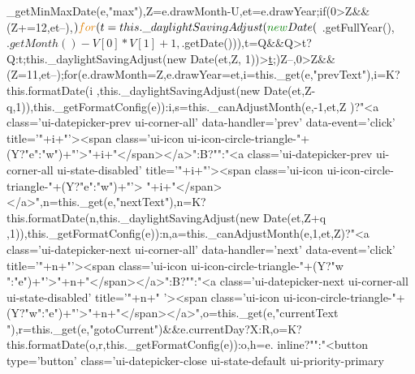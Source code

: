 \begin{DoxyCode}
      \_getMinMaxDate(e,\textcolor{stringliteral}{"max"}),Z=e.drawMonth-U,et=e.drawYear;\textcolor{keywordflow}{if}(0>Z&&(Z+=12,et--),$)\textcolor{keywordflow}{for}(t=this.\_daylightSavingAdjust(\textcolor{keyword}{new} Date($
      .getFullYear(),$.getMonth()-V[0]*V[1]+1,$.getDate())),t=Q&&Q>t?Q:t;this.\_daylightSavingAdjust(\textcolor{keyword}{new} Date(et,Z,
      1))>\hyperlink{jquery-2_80_83_8min_8js_aaccc9105df5383111407fd5b41255e23}{t};)Z--,0>Z&&(Z=11,et--);\textcolor{keywordflow}{for}(e.drawMonth=Z,e.drawYear=et,i=\textcolor{keyword}{this}.\_get(e,\textcolor{stringliteral}{"prevText"}),i=K?this.formatDate(i
      ,this.\_daylightSavingAdjust(\textcolor{keyword}{new} Date(et,Z-q,1)),this.\_getFormatConfig(e)):i,s=this.\_canAdjustMonth(e,-1,et,Z
      )?\textcolor{stringliteral}{"<a class='ui-datepicker-prev ui-corner-all' data-handler='prev' data-event='click' title='"}+i+\textcolor{stringliteral}{"'><span
       class='ui-icon ui-icon-circle-triangle-"}+(Y?\textcolor{stringliteral}{"e"}:\textcolor{stringliteral}{"w"})+\textcolor{stringliteral}{"'>"}+i+\textcolor{stringliteral}{"</span></a>"}:B?\textcolor{stringliteral}{""}:\textcolor{stringliteral}{"<a class='ui-datepicker-prev
       ui-corner-all ui-state-disabled' title='"}+i+\textcolor{stringliteral}{"'><span class='ui-icon ui-icon-circle-triangle-"}+(Y?\textcolor{stringliteral}{"e"}:\textcolor{stringliteral}{"w"})+\textcolor{stringliteral}{"'>
      "}+i+\textcolor{stringliteral}{"</span></a>"},n=this.\_get(e,\textcolor{stringliteral}{"nextText"}),n=K?this.formatDate(n,this.\_daylightSavingAdjust(new Date(et,Z+q
      ,1)),this.\_getFormatConfig(e)):n,a=this.\_canAdjustMonth(e,1,et,Z)?\textcolor{stringliteral}{"<a class='ui-datepicker-next
       ui-corner-all' data-handler='next' data-event='click' title='"}+n+\textcolor{stringliteral}{"'><span class='ui-icon ui-icon-circle-triangle-"}+(Y?\textcolor{stringliteral}{"w
      "}:\textcolor{stringliteral}{"e"})+\textcolor{stringliteral}{"'>"}+n+\textcolor{stringliteral}{"</span></a>"}:B?\textcolor{stringliteral}{""}:\textcolor{stringliteral}{"<a class='ui-datepicker-next ui-corner-all ui-state-disabled' title='"}+n+\textcolor{stringliteral}{"
      '><span class='ui-icon ui-icon-circle-triangle-"}+(Y?\textcolor{stringliteral}{"w"}:\textcolor{stringliteral}{"e"})+\textcolor{stringliteral}{"'>"}+n+\textcolor{stringliteral}{"</span></a>"},o=this.\_get(e,\textcolor{stringliteral}{"currentText
      "}),r=this.\_get(e,\textcolor{stringliteral}{"gotoCurrent"})&&e.currentDay?X:R,o=K?this.formatDate(o,r,this.\_getFormatConfig(e)):o,h=e.
      inline?\textcolor{stringliteral}{""}:\textcolor{stringliteral}{"<button type='button' class='ui-datepicker-close ui-state-default ui-priority-primary
}
\end{DoxyCode}
